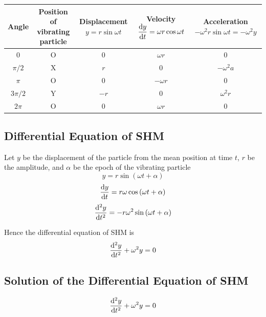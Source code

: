 \documentclass[12pt]{article}
\numberwithin{equation}{subsection}
\begin{document}
\vspace{20pt}
\begin{center}
    \begin{tabular}{c | c | c | c | c}
        Angle & \makecell{Position of \\ vibrating particle} & \makecell{Displacement \\ $y = r \sin{\omega t}$} & \makecell{Velocity \\ $\displaystyle \dv{y}{t} = \omega r \cos{\omega t}$} & \makecell{Acceleration \\ $-\omega^2 r \sin{\omega t} = -\omega^2 y$} \\\hline\hline
        0 & O & 0 & $\omega r$ & 0 \\\hline
        $\pi/2$ & X & $r$ & 0 & $-\omega^2 a$ \\\hline
        $\pi$ & O & 0 & $-\omega r$ & 0 \\\hline
        $3\pi/2$ & Y & $-r$ & 0 & $\omega^2 r$ \\\hline
        $2\pi$ & O & 0 & $\omega r$ & 0
    \end{tabular}
\end{center}

\subsection{Differential Equation of SHM}
Let $y$ be the displacement of the particle from the mean position at time $t$, $r$ be the amplitude, and $\alpha$ be the epoch of the vibrating particle \\
\begin{equation}
    y = r \sin{(\omega t + \alpha)}
\end{equation}
\begin{equation}
    \dv{y}{t} = r \omega \cos{(\omega t + \alpha)}
\end{equation}
\begin{equation}
    \dv[2]{y}{t} = -r \omega^2 \sin{(\omega t + \alpha)}
\end{equation}

Hence the differential equation of SHM is
\begin{equation}
    \dv[2]{y}{t} + \omega^2 y = 0
\end{equation}

\subsection{Solution of the Differential Equation of SHM}
\begin{equation}
    \dv[2]{y}{t} + \omega^2 y = 0
\end{equation}
\end{document}
